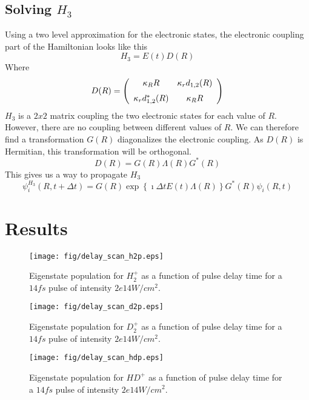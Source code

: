 \documentclass[a4paper]{article}
\begin{document}
\subsection{Solving $H_3$}
Using a two level approximation for the electronic states, the electronic coupling part of the Hamiltonian looks like this
\begin{equation}
 	H_3 = E(t) D(R)
\end{equation}
Where
\[
	D(R) = \left(\begin{array}{cc}
			\kappa_R R & \kappa_r d_{1,2}(R) \\
			\noalign{\medskip}
			\kappa_r d_{1,2}^*(R) & \kappa_R R
		\end{array}
		\right)
\]
$H_3$ is a $2x2$ matrix coupling the two electronic states for each value of $R$. However, there are no coupling between different values of $R$. We can 
therefore find a transformation $G(R)$ diagonalizes the electronic coupling. As $D(R)$ is Hermitian, this transformation will be orthogonal.
\begin{equation}
	D(R) = G(R) \Lambda(R) G^*(R)
\end{equation}
This gives us a way to propagate $H_3$
\begin{equation}
 	\psi_i^{H_3}(R, t+\Delta t) = G(R) \exp \left\{ \imath \Delta t E(t) \Lambda(R) \right\} G^*(R) \psi_i(R, t)
\end{equation}

\section{Results}
\begin{figure}[p]
 \centering
 \texttt{[image: fig/delay\_scan\_h2p.eps]}
 \caption{Eigenstate population for $H_2^+$ as a function of pulse delay time for a $14fs$ pulse of intensity $2e14 W/cm^2$.}
 \label{fig:delay_scan_h2+}
\end{figure}

\begin{figure}[p]
 \centering
 \texttt{[image: fig/delay\_scan\_d2p.eps]}
 \caption{Eigenstate population for $D_2^+$ as a function of pulse delay time for a $14fs$ pulse of intensity $2e14 W/cm^2$.}
 \label{fig:delay_scan_d2+}
\end{figure}

\begin{figure}[p]
 \centering
 \texttt{[image: fig/delay\_scan\_hdp.eps]}
 \caption{Eigenstate population for $HD^+$ as a function of pulse delay time for a $14fs$ pulse of intensity $2e14 W/cm^2$.}
 \label{fig:delay_scan_hd+}
\end{figure}
\end{document}
